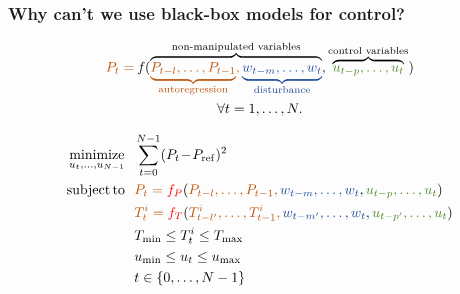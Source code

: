 \begin{frame}[t]
	
	\frametitle{Why can't we use black-box models for control?}
	
		\begin{gather*}
		\color[RGB]{190,81,8} P_t = \color{black}\mathit{f} (\overbrace{\color[RGB]{190,81,8} \underbrace{P_{t-l}, \dots, P_{t-1}}_\text{autoregression}, \color[RGB]{29,73,153} \underbrace{ w_{t-m}, \dots, w_t}_\text{disturbance} \color{black}}^\text{non-manipulated variables}
		\color{black} ,\overbrace{\color[RGB]{74,133,34} u_{t-p}, \dots, u_t}^\text{control variables} \color{black}) \\
		\forall t =1,\dots, N.
		\end{gather*}
		
		\begin{align*}
		&\minimize_{u_t,\dots,u_{N-1}} \  \  \sum_{t=0}^{N-1} (P_{t}\!-\!P_{\mathrm{ref}})^2\\
		& 
		\begin{aligned}
		\subjectto \  \  & \color[RGB]{190,81,8} P_t = \color{red}f_P \color{black} (\color[RGB]{190,81,8} P_{t-l}, \dots, P_{t-1}, \color[RGB]{29,73,153} w_{t-m}, \dots, w_t\color{black}
		\color{black} ,\color[RGB]{74,133,34} u_{t-p}, \dots, u_t \color{black}) \\
		 & \color[RGB]{190,81,8} T_t^i  =  \color{red}f_T \color{black} (\color[RGB]{190,81,8} T^i _{t-l'}, \dots, T^i_{t-1}, \color[RGB]{29,73,153} w_{t-m'}, \dots, w_t\color{black} \color{black} ,\color[RGB]{74,133,34} u_{t-p'}, \dots, u_t \color{black}) \\
		& T_{\mathrm{min}} \leq T_{t}^i \leq T_{\mathrm{max}} \\	
		& u_{\mathrm{min}} \leq u_{t} \leq u_{\mathrm{max}} \\
		& t \in \{ 0, \dots, N-1 \}
		\end{aligned}
		\end{align*}
	
\end{frame}

